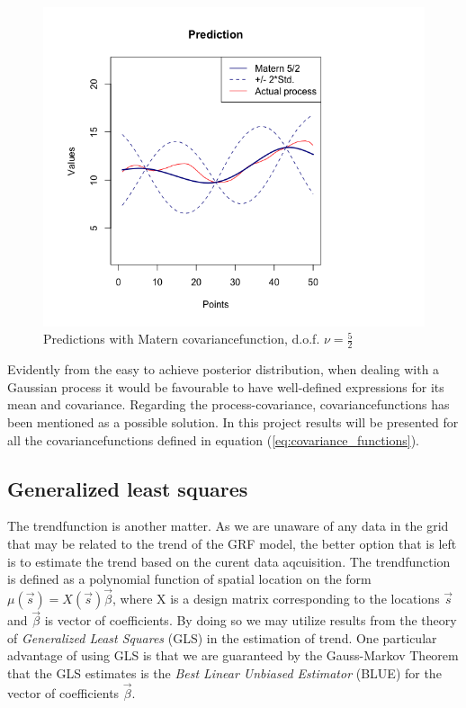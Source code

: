\begin{figure}
	\centering
	\hspace{60pt}
	\includegraphics[width=0.8\linewidth]{figurer/prediction_525.png}
    \caption{Predictions with Matern covariancefunction, d.o.f. $\nu = \frac{5}{2}$}
    \label{fig:prediction_525}
\end{figure}

Evidently from the easy to achieve posterior distribution, when dealing with a Gaussian process it would be favourable to have well-defined expressions for its mean and covariance. Regarding the process-covariance, covariancefunctions has been mentioned as a possible solution. In this project results will be presented for all the covariancefunctions defined in equation (\ref{eq:covariance_functions}).

\subsection{Generalized least squares}

The trendfunction is another matter. As we are unaware of any data in the grid that may be related to the trend of the GRF model, the better option that is left is to estimate the trend based on the curent data aqcuisition. The trendfunction is defined as a polynomial function of spatial location on the form $\mu(\vec{s}) = X(\vec{s})\vec{\beta}$, where X is a design matrix corresponding to the locations $\vec{s}$ and $\vec{\beta}$ is vector of coefficients. By doing so we may utilize results from the theory of \textit{Generalized Least Squares} (GLS) in the estimation of trend. One particular advantage of using GLS is that we are guaranteed by the Gauss-Markov Theorem that the GLS estimates is the \textit{Best Linear Unbiased Estimator} (BLUE) for the vector of coefficients $\vec{\beta}$. 

